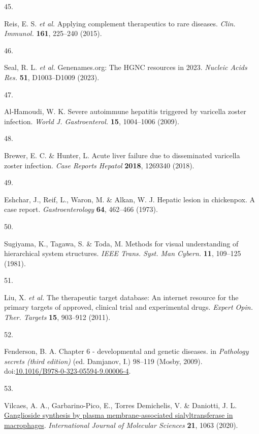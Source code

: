 \documentclass[
]{article}
\newlength{\cslhangindent}
\newlength{\csllabelwidth}
\newenvironment{CSLReferences}[2] %
 {\begin{list}{}{%
  \setlength{\itemindent}{0pt}
  \setlength{\leftmargin}{0pt}
  \setlength{\parsep}{0pt}
  \ifodd #1
   \setlength{\leftmargin}{\cslhangindent}
   \setlength{\itemindent}{-1\cslhangindent}
  \fi
  \setlength{\itemsep}{#2\baselineskip}}}
 {\end{list}}
\newcommand{\CSLLeftMargin}[1]{\parbox[t]{\csllabelwidth}{\strut#1\strut}}
\newcommand{\CSLRightInline}[1]{\parbox[t]{\linewidth - \csllabelwidth}{\strut#1\strut}}
\begin{document}
\begin{CSLReferences}{0}{0}
\CSLLeftMargin{45. }%
\CSLRightInline{Reis, E. S. \emph{et al.} Applying complement
therapeutics to rare diseases. \emph{Clin. Immunol.} \textbf{161},
225--240 (2015).}

\CSLLeftMargin{46. }%
\CSLRightInline{Seal, R. L. \emph{et al.} Genenames.org: The {HGNC}
resources in 2023. \emph{Nucleic Acids Res.} \textbf{51}, D1003--D1009
(2023).}

\CSLLeftMargin{47. }%
\CSLRightInline{Al-Hamoudi, W. K. Severe autoimmune hepatitis triggered
by varicella zoster infection. \emph{World J. Gastroenterol.}
\textbf{15}, 1004--1006 (2009).}

\CSLLeftMargin{48. }%
\CSLRightInline{Brewer, E. C. \& Hunter, L. Acute liver failure due to
disseminated varicella zoster infection. \emph{Case Reports Hepatol}
\textbf{2018}, 1269340 (2018).}

\CSLLeftMargin{49. }%
\CSLRightInline{Eshchar, J., Reif, L., Waron, M. \& Alkan, W. J. Hepatic
lesion in chickenpox. A case report. \emph{Gastroenterology}
\textbf{64}, 462--466 (1973).}

\CSLLeftMargin{50. }%
\CSLRightInline{Sugiyama, K., Tagawa, S. \& Toda, M. Methods for visual
understanding of hierarchical system structures. \emph{IEEE Trans. Syst.
Man Cybern.} \textbf{11}, 109--125 (1981).}

\CSLLeftMargin{51. }%
\CSLRightInline{Liu, X. \emph{et al.} The therapeutic target database:
An internet resource for the primary targets of approved, clinical trial
and experimental drugs. \emph{Expert Opin. Ther. Targets} \textbf{15},
903--912 (2011).}

\CSLLeftMargin{52. }%
\CSLRightInline{Fenderson, B. A. Chapter 6 - developmental and genetic
diseases. in \emph{Pathology secrets (third edition)} (ed. Damjanov, I.)
98--119 (Mosby, 2009).
doi:\href{https://doi.org/10.1016/B978-0-323-05594-9.00006-4}{10.1016/B978-0-323-05594-9.00006-4}.}

\CSLLeftMargin{53. }%
\CSLRightInline{Vilcaes, A. A., Garbarino-Pico, E., Torres Demichelis,
V. \& Daniotti, J. L.
\href{https://doi.org/10.3390/ijms21031063}{Ganglioside synthesis by
plasma membrane-associated sialyltransferase in macrophages}.
\emph{International Journal of Molecular Sciences} \textbf{21}, 1063
(2020).}


\end{CSLReferences}
\end{document}
